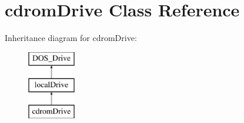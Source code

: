 \hypertarget{classcdromDrive}{\section{cdrom\-Drive Class Reference}
\label{classcdromDrive}
}
Inheritance diagram for cdrom\-Drive\-:\begin{figure}[H]
\begin{center}
\leavevmode
\includegraphics[height=3.000000cm]{classcdromDrive}
\end{center}
\end{figure}

